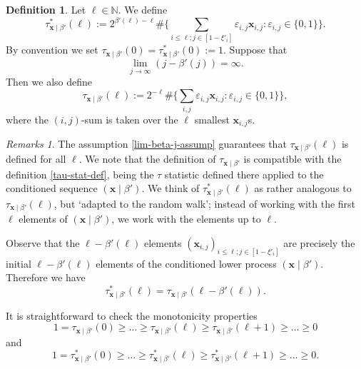 \documentclass[11pt,reqno]{amsart}
\numberwithin{equation}{section}
\theoremstyle{definition}
\newtheorem{definition}[theorem]{Definition}
\theoremstyle{remark}
\newtheorem*{remarks}{Remarks}
\newcommand{\mbf}{\mathbf}
\newcommand{\eps}{\varepsilon}
\renewcommand{\le}{\leqslant}
\renewcommand{\ge}{\geqslant}
\newcommand\N{\mathbb{N}}
\begin{document}
\begin{definition}\label{y-beta-def} Let $\ell \in \N$. We define
\begin{equation}\label{y-beta-form} \tau^*_{\mbf{x} \mid \beta'}(\ell) := 2^{\beta'(\ell) - \ell} \# \big\{ \sum_{i \le \ell; j \in [1 - \xi'_i]} \eps_{i,j} \mbf{x}_{i,j} : \eps_{i,j} \in \{0,1\}\big\}.\end{equation}   By convention we set $\tau_{\mbf{x} \mid \beta'}(0) = \tau^*_{\mbf{x} \mid \beta'}(0) := 1$. Suppose that 
\begin{equation}\label{lim-beta-j-assump} \lim_{j \rightarrow \infty} (j - \beta'(j)) = \infty.\end{equation}
Then we also define
\begin{equation}\label{tau-unstar-def} \tau_{\mbf{x} \mid \beta'}(\ell) := 2^{-\ell} \# \big\{ \sum_{i,j} \eps_{i,j} \mbf{x}_{i,j} : \eps_{i,j} \in \{0,1\}\big\},\end{equation} where the $(i,j)$-sum is taken over the $\ell$ smallest $\mbf{x}_{i,j}$s. 
\end{definition}
\begin{remarks}
The assumption \cref{lim-beta-j-assump} guarantees that $\tau_{\mbf{x} \mid \beta'}(\ell)$ is defined for all $\ell$. We note that the definition of $\tau_{\mbf{x} \mid \beta'}$ is compatible with the definition \cref{tau-stat-def}, being the $\tau$ statistic defined there applied to the conditioned sequence $(\mbf{x} \mid \beta')$.
We think of $\tau^*_{\mbf{x} \mid \beta'}(\ell)$ as rather analogous to $\tau_{\mbf{x} \mid \beta'}(\ell)$, but `adapted to the random walk'; instead of working with the first $\ell$ elements of $(\mbf{x} \mid \beta')$, we work with the elements up to $\ell$.
\end{remarks}

Observe that the $\ell - \beta'(\ell)$ elements $(\mbf{x}_{i,j})_{i \le \ell; j \in [1 - \xi'_i]}$ are precisely the initial $\ell - \beta'(\ell)$ elements of the conditioned lower process $(\mbf{x} \mid \beta')$. Therefore we have
\begin{equation}\label{tau-y-relation}
\tau^*_{\mbf{x} \mid \beta'}(\ell) = \tau_{\mbf{x} \mid \beta'}(\ell - \beta'(\ell)).
\end{equation}


It is straightforward to check the monotonicity properties
\begin{equation}\label{y-unstar-monotonicity} 1 = \tau_{\mbf{x} \mid \beta'}(0) \ge \dots \ge \tau_{\mbf{x} \mid \beta'}(\ell) \ge \tau_{\mbf{x} \mid \beta'}(\ell+1) \ge \dots \ge  0\end{equation} and
\begin{equation}\label{y-monotonicity} 1 = \tau^*_{\mbf{x} \mid \beta'}(0) \ge \dots \ge \tau^*_{\mbf{x} \mid \beta'}(\ell) \ge \tau^*_{\mbf{x} \mid \beta'}(\ell+1) \ge \dots \ge  0.\end{equation}
\end{document}
